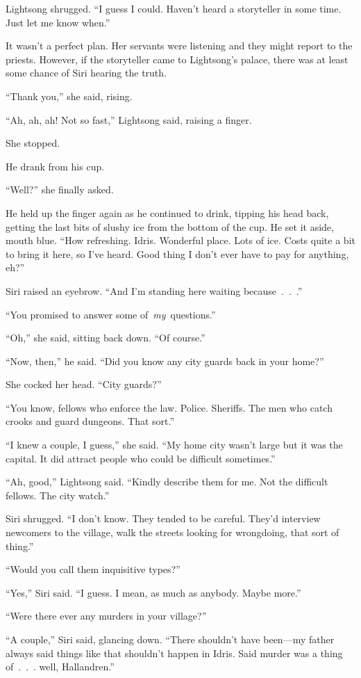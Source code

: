 Lightsong shrugged. “I guess I could. Haven’t heard a storyteller in some time. Just let me know when.”

It wasn’t a perfect plan. Her servants were listening and they might report to the priests. However, if the storyteller came to Lightsong’s palace, there was at least some chance of Siri hearing the truth.

“Thank you,” she said, rising.

“Ah, ah, ah! Not so fast,” Lightsong said, raising a finger.

She stopped.

He drank from his cup.

“Well?” she finally asked.

He held up the finger again as he continued to drink, tipping his head back, getting the last bits of slushy ice from the bottom of the cup. He set it aside, mouth blue. “How refreshing. Idris. Wonderful place. Lots of ice. Costs quite a bit to bring it here, so I’ve heard. Good thing I don’t ever have to pay for anything, eh?”

Siri raised an eyebrow. “And I’m standing here waiting because~.~.~.”

“You promised to answer some of~\textit{my}~questions.”

“Oh,” she said, sitting back down. “Of course.”

“Now, then,” he said. “Did you know any city guards back in your home?”

She cocked her head. “City guards?”

“You know, fellows who enforce the law. Police. Sheriffs. The men who catch crooks and guard dungeons. That sort.”

“I knew a couple, I guess,” she said. “My home city wasn’t large but it was the capital. It did attract people who could be difficult sometimes.”

“Ah, good,” Lightsong said. “Kindly describe them for me. Not the difficult fellows. The city watch.”

Siri shrugged. “I don’t know. They tended to be careful. They’d interview newcomers to the village, walk the streets looking for wrongdoing, that sort of thing.”

“Would you call them inquisitive types?”

“Yes,” Siri said. “I guess. I mean, as much as anybody. Maybe more.”

“Were there ever any murders in your village?”

“A couple,” Siri said, glancing down. “There shouldn’t have been—my father always said things like that shouldn’t happen in Idris. Said murder was a thing of~.~.~. well, Hallandren.”

